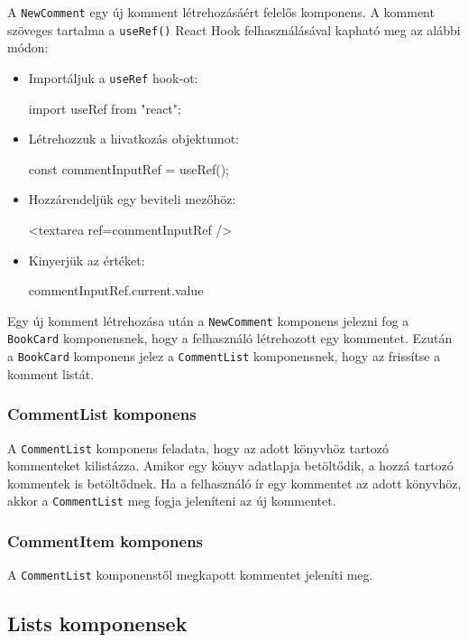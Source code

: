 A \texttt{NewComment} egy új komment létrehozásáért felelős komponens. A komment szöveges tartalma a \texttt{useRef()} React Hook felhasználásával kapható meg az alábbi módon:
\begin{itemize}
\item Importáljuk a \texttt{useRef} hook-ot:
\begin{java}
import { useRef } from "react";
\end{java}
\item Létrehozzuk a hivatkozás objektumot:
\begin{java}
const commentInputRef = useRef();
\end{java}
\item Hozzárendeljük egy beviteli mezőhöz:
\begin{java}
<textarea ref={commentInputRef} />
\end{java}
\item Kinyerjük az értéket:
\begin{java}
commentInputRef.current.value
\end{java}
\end{itemize}

Egy új komment létrehozása után a \texttt{NewComment} komponens jelezni fog a \texttt{BookCard} komponensnek, hogy a felhasználó létrehozott egy kommentet. Ezután a \texttt{BookCard} komponens jelez a \texttt{CommentList} komponensnek, hogy az frissítse a komment listát.

\subsubsection{CommentList komponens}

A \texttt{CommentList} komponens feladata, hogy az adott könyvhöz tartozó kommenteket kilistázza. Amikor egy könyv adatlapja betöltődik, a hozzá tartozó kommentek is betöltődnek. Ha a felhasználó ír egy kommentet az adott könyvhöz, akkor a \texttt{CommentList} meg fogja jeleníteni az új kommentet.

\subsubsection{CommentItem komponens}

A \texttt{CommentList} komponenstől megkapott kommentet jeleníti meg.

\subsection{Lists komponensek}

